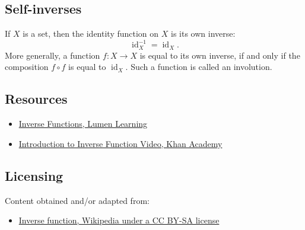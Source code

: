 \subsection{Self-inverses}
\label{sss:self-4f9b}

If $X$ is a set, then the identity function on $X$ is its own inverse:
\[
\operatorname{id}_X^{-1} = \operatorname{id}_X.
\]
More generally, a function $f : X \to X$ is equal to its own inverse, if and only if the composition $f \circ f$ is equal to $\operatorname{id}_X$. Such a function is called an involution.

\subsection{Resources}
\label{sss:reso-55b5}

\begin{itemize}
    \item \href{https://courses.lumenlearning.com/collegealgebra2017/chapter/introduction-inverse-functions/}{Inverse Functions, Lumen Learning}
    \item \href{https://www.khanacademy.org/math/algebra/x2f8bb11595b61c86:functions/x2f8bb11595b61c86:inverse-functions-intro/v/introduction-to-function-inverses}{Introduction to Inverse Function Video, Khan Academy}
\end{itemize}

\subsection{Licensing}
\label{sss:lice-7352}

Content obtained and/or adapted from:

\begin{itemize}
    \item \href{https://en.wikipedia.org/wiki/Inverse_function}{Inverse function, Wikipedia under a CC BY-SA license}
\end{itemize}

